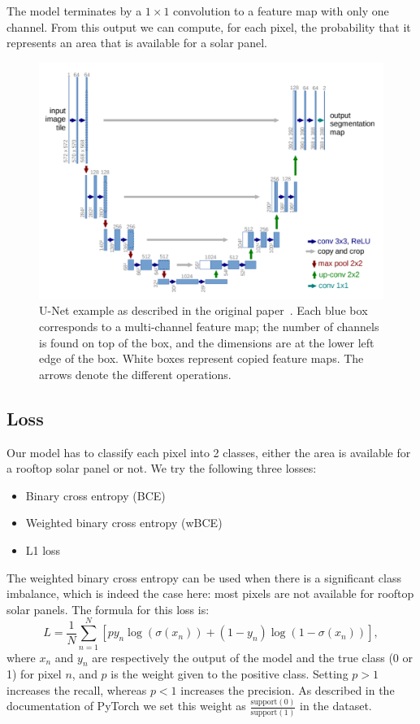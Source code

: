 \documentclass[10pt,conference]{IEEEtran}
\begin{document}
The model terminates by a $1 \times 1$ convolution to a feature map with only one channel.
From this output we can compute, for each pixel, the probability that it represents an area that is available for a solar panel.

\begin{figure}[tbp]
    \centering
    \includegraphics[width=.8\columnwidth]{report/images/UNet.png}
    \caption{
        U-Net example as described in the original paper~\cite{ronneberger2015unet}.
        Each blue box corresponds to a multi-channel feature map; the number of channels is found on top of the box, and the dimensions are at the lower left edge of the box.
        White boxes represent copied feature maps.
        The arrows denote the different operations.
    }
    \label{fig:UNetarchitecture}
\end{figure}

\subsection{Loss}\label{loss}
Our model has to classify each pixel into 2 classes, either the area is available for a rooftop solar panel or not. We try the following three losses:
\begin{itemize}
    \item Binary cross entropy (BCE)
    \item Weighted binary cross entropy (wBCE)
    \item L1 loss
\end{itemize}

The weighted binary cross entropy can be used when there is a significant class imbalance, which is indeed the case here:
most pixels are not available for rooftop solar panels. 
The formula for this loss is:
\begin{equation*}
    L = \frac{1}{N} \sum_{n=1}^N  [py_n \log(\sigma(x_n))
        + (1-y_n) \log(1-\sigma(x_n))],
\end{equation*}
where $x_n$ and $y_n$ are respectively the output of the model and the true class (0 or 1) for pixel $n$,
and $p$ is the weight given to the positive class. 
Setting $p>1$ increases the recall, whereas $p<1$ increases the precision.
As described in the documentation of PyTorch we set this weight as
$\frac{\mathrm{support}(0)}{\mathrm{support}(1)}$
in the dataset.
\end{document}
